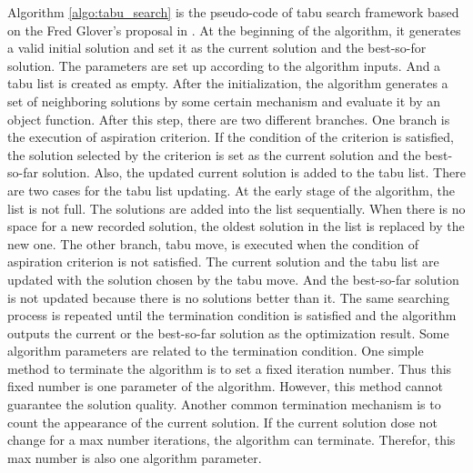 		Algorithm \ref{algo:tabu_search} is the pseudo-code of tabu search framework based on the Fred Glover's proposal in \cite{doi:10.1287/ijoc.1.3.190}. 
		At the beginning of the algorithm, it generates a valid initial solution and set it as the current solution and the best-so-for solution. The parameters are set up according to the algorithm inputs. And a tabu list is created as empty.
		After the initialization, the algorithm generates a set of neighboring solutions by some certain mechanism and evaluate it by an object function. After this step, there are two different branches.
		One branch is the execution of aspiration criterion. If the condition of the criterion is satisfied, the solution selected by the
		criterion is set as the current solution and the best-so-far solution. Also, the updated current solution is added to the tabu
		list. There are two cases for the tabu list updating. At the early stage of the algorithm, the list is not full. The solutions are added into the list sequentially. When there is no space for a new recorded solution, the oldest solution in the list is replaced by the new one.
		The other branch, tabu move, is executed when the condition of aspiration criterion is not satisfied. The current solution and the tabu list are updated with the solution chosen by the tabu move. And the best-so-far solution is not updated because there is no solutions better than it.
		The same searching process is repeated until the termination condition is satisfied and the algorithm outputs the current or the best-so-far solution as the optimization result. Some algorithm parameters are related to the termination condition. One simple
		method to terminate the algorithm is to set a fixed iteration number. Thus this fixed number is one parameter of the algorithm. However, this method cannot guarantee the solution quality. Another common termination mechanism is to count the appearance of the current solution. If the current solution dose not change for a max number iterations, the algorithm can terminate. Therefor,
		this max number is also one algorithm parameter.
		
